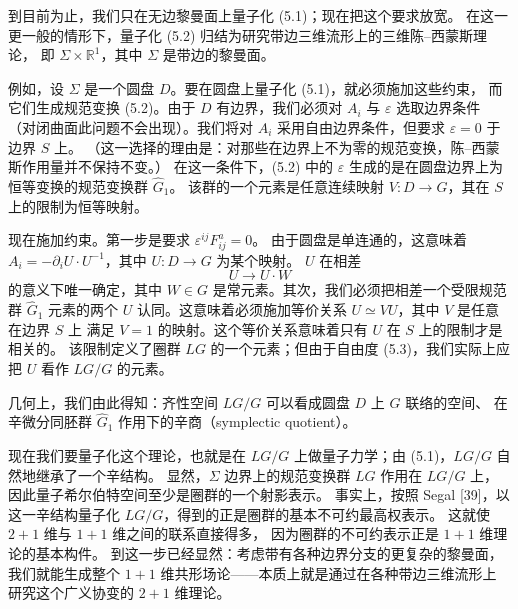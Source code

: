 \documentclass[11pt,a4paper]{article}
\begin{document}
到目前为止，我们只在无边黎曼面上量子化 (5.1)；现在把这个要求放宽。
在这一更一般的情形下，量子化 (5.2) 归结为研究带边三维流形上的三维陈–西蒙斯理论，
即 $\Sigma\times\mathbb{R}^1$，其中 $\Sigma$ 是带边的黎曼面。

例如，设 $\Sigma$ 是一个圆盘 $D$。要在圆盘上量子化 (5.1)，就必须施加这些约束，
而它们生成规范变换 (5.2)。由于 $D$ 有边界，我们必须对 $A_i$ 与 $\varepsilon$ 选取边界条件
（对闭曲面此问题不会出现）。我们将对 $A_i$ 采用自由边界条件，但要求 $\varepsilon=0$ 于边界 $S$ 上。
（这一选择的理由是：对那些在边界上不为零的规范变换，陈–西蒙斯作用量并不保持不变。）
在这一条件下，(5.2) 中的 $\varepsilon$ 生成的是在圆盘边界上为恒等变换的规范变换群 $\hat{G}_1$。
该群的一个元素是任意连续映射 $V: D\to G$，其在 $S$ 上的限制为恒等映射。


现在施加约束。第一步是要求 $\varepsilon^{ij}F^a_{ij}=0$。
由于圆盘是单连通的，这意味着 $A_i = -\partial_i U\cdot U^{-1}$，其中 $U: D\to G$ 为某个映射。
$U$ 在相差
\begin{equation}
    U \to U\cdot W
    \tag{5.3}
\end{equation}
的意义下唯一确定，其中 $W\in G$ 是常元素。其次，我们必须把相差一个受限规范群 $\hat{G}_1$
元素的两个 $U$ 认同。这意味着必须施加等价关系 $U\simeq VU$，其中 $V$ 是任意在边界 $S$ 上
满足 $V=1$ 的映射。这个等价关系意味着只有 $U$ 在 $S$ 上的限制才是相关的。
该限制定义了圈群 $LG$ 的一个元素；但由于自由度 (5.3)，我们实际上应把 $U$ 看作 $LG/G$ 的元素。

几何上，我们由此得知：齐性空间 $LG/G$ 可以看成圆盘 $D$ 上 $G$ 联络的空间、
在辛微分同胚群 $\hat{G}_1$ 作用下的辛商（symplectic quotient）。

现在我们要量子化这个理论，也就是在 $LG/G$ 上做量子力学；由 (5.1)，$LG/G$ 自然地继承了一个辛结构。
显然，$\Sigma$ 边界上的规范变换群 $LG$ 作用在 $LG/G$ 上，
因此量子希尔伯特空间至少是圈群的一个射影表示。
事实上，按照 Segal [39]，以这一辛结构量子化 $LG/G$，得到的正是圈群的基本不可约最高权表示。
这就使 $2+1$ 维与 $1+1$ 维之间的联系直接得多，
因为圈群的不可约表示正是 $1+1$ 维理论的基本构件。
到这一步已经显然：考虑带有各种边界分支的更复杂的黎曼面，
我们就能生成整个 $1+1$ 维共形场论——本质上就是通过在各种带边三维流形上
研究这个广义协变的 $2+1$ 维理论。
\end{document}

